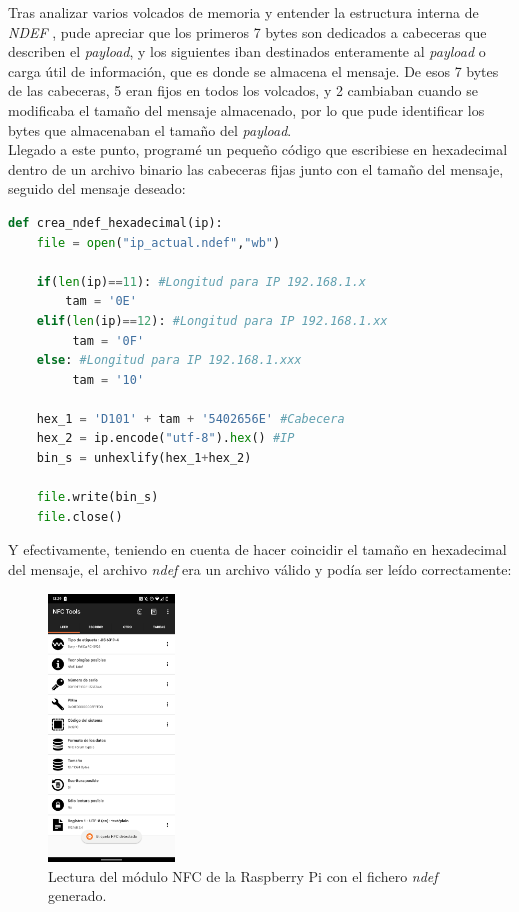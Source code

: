 Tras analizar varios volcados de memoria y entender la estructura interna de
\emph{NDEF} \cite{ndef-explicado}, pude apreciar que los primeros 7 bytes son
dedicados a cabeceras que describen el \emph{payload}, y los siguientes iban
destinados enteramente al \emph{payload} o carga útil de información, que es
donde se almacena el mensaje. De esos 7 bytes de las cabeceras, 5 eran fijos en
todos los volcados, y 2 cambiaban cuando se modificaba el tamaño del mensaje
almacenado, por lo que pude identificar los bytes que almacenaban el tamaño del
\emph{payload}.\\

Llegado a este punto, programé un pequeño código que escribiese en hexadecimal
dentro de un archivo binario las cabeceras fijas junto con el tamaño del
mensaje, seguido del mensaje deseado:\\

\begin{lstlisting}[style=codigo,label={lst:listing-python},language=Python]
def crea_ndef_hexadecimal(ip):
    file = open("ip_actual.ndef","wb")

    if(len(ip)==11): #Longitud para IP 192.168.1.x
        tam = '0E'
    elif(len(ip)==12): #Longitud para IP 192.168.1.xx
         tam = '0F'
    else: #Longitud para IP 192.168.1.xxx
         tam = '10'
    
    hex_1 = 'D101' + tam + '5402656E' #Cabecera
    hex_2 = ip.encode("utf-8").hex() #IP
    bin_s = unhexlify(hex_1+hex_2)

    file.write(bin_s)
    file.close()
\end{lstlisting}

\newpage
Y efectivamente, teniendo en cuenta de hacer coincidir el tamaño en hexadecimal
del mensaje, el archivo \emph{ndef} era un archivo válido y podía ser leído correctamente:

\begin{figure}[h!]
    \centering
    \includegraphics[width=0.3\textwidth]{fotos/lectura_raspberry.png}
    \caption{Lectura del módulo NFC de la Raspberry Pi con el fichero \emph{ndef} generado.}
\end{figure}

